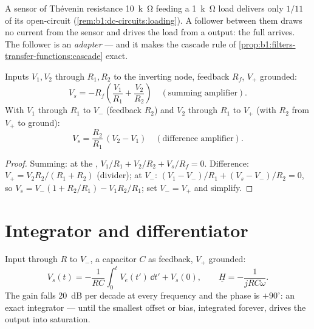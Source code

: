 \begin{example}\label{ex:b1:operational-amplifier:follower}
A sensor of Thévenin resistance \qty{10}{k\ohm} feeding a \qty{1}{k\ohm}
load delivers only $1/11$ of its open-circuit 
(\cref{rem:b1:dc-circuits:loading}). A follower between them draws no
current from the sensor and drives the load from a 
output: the full  arrives. The follower is an \emph{
adapter} --- and it makes the cascade rule of
\cref{prop:b1:filters-transfer-functions:cascade} exact.
\end{example}

\begin{proposition}\label{prop:b1:operational-amplifier:sumdiff}
Inputs $V_1, V_2$ through $R_1, R_2$ to the inverting node, feedback
$R_f$, $V_+$ grounded:
\[
V_s = -R_f\left(\frac{V_1}{R_1} + \frac{V_2}{R_2}\right)
\quad (\text{summing amplifier}).
\]
With $V_1$ through $R_1$ to $V_-$ (feedback $R_2$) and $V_2$ through
$R_1$ to $V_+$ (with $R_2$ from $V_+$ to ground):
\[
V_s = \frac{R_2}{R_1}\,(V_2 - V_1)
\quad (\text{difference amplifier}).
\]
\end{proposition}

\begin{proof}
Summing:  at the , $V_1/R_1 + V_2/R_2 + V_s/R_f =
0$. Difference: $V_+ = V_2R_2/(R_1 + R_2)$ (divider);  at $V_-$:
$(V_1 - V_-)/R_1 + (V_s - V_-)/R_2 = 0$, so $V_s = V_-(1 + R_2/R_1) -
V_1R_2/R_1$; set $V_- = V_+$ and simplify.
\end{proof}

\section{Integrator and differentiator}

\begin{proposition}[Integrator]\label{prop:b1:operational-amplifier:integrator}
Input through $R$ to $V_-$, a capacitor $C$ as feedback, $V_+$
grounded:
\[
V_s(t) = -\frac{1}{RC}\int_0^t V_e(t')\,\dd t' + V_s(0),
\qquad
\underline H = -\frac{1}{jRC\omega} .
\]
The gain falls \qty{20}{dB} per decade at every frequency and the phase
is $+90^\circ$: an exact integrator --- until the smallest offset or
bias, integrated forever, drives the output into saturation.
\end{proposition}

